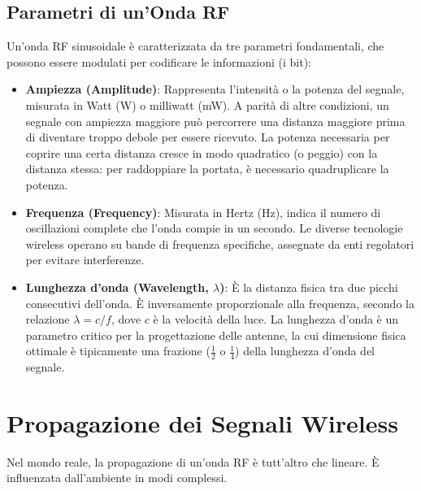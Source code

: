 \subsection{Parametri di un'Onda RF}
Un'onda RF sinusoidale è caratterizzata da tre parametri fondamentali, che possono essere modulati per codificare le informazioni (i bit):
\begin{itemize}
    \item \textbf{Ampiezza (Amplitude)}: Rappresenta l'intensità o la potenza del segnale, misurata in Watt (W) o milliwatt (mW). A parità di altre condizioni, un segnale con ampiezza maggiore può percorrere una distanza maggiore prima di diventare troppo debole per essere ricevuto. La potenza necessaria per coprire una certa distanza cresce in modo quadratico (o peggio) con la distanza stessa: per raddoppiare la portata, è necessario quadruplicare la potenza.
    \item \textbf{Frequenza (Frequency)}: Misurata in Hertz (Hz), indica il numero di oscillazioni complete che l'onda compie in un secondo. Le diverse tecnologie wireless operano su bande di frequenza specifiche, assegnate da enti regolatori per evitare interferenze.
    \item \textbf{Lunghezza d'onda (Wavelength, $\lambda$)}: È la distanza fisica tra due picchi consecutivi dell'onda. È inversamente proporzionale alla frequenza, secondo la relazione $\lambda = c/f$, dove $c$ è la velocità della luce. La lunghezza d'onda è un parametro critico per la progettazione delle antenne, la cui dimensione fisica ottimale è tipicamente una frazione ($\frac{1}{2}$ o $\frac{1}{4}$) della lunghezza d'onda del segnale.
\end{itemize}


\section{Propagazione dei Segnali Wireless}
Nel mondo reale, la propagazione di un'onda RF è tutt'altro che lineare. È influenzata dall'ambiente in modi complessi.

